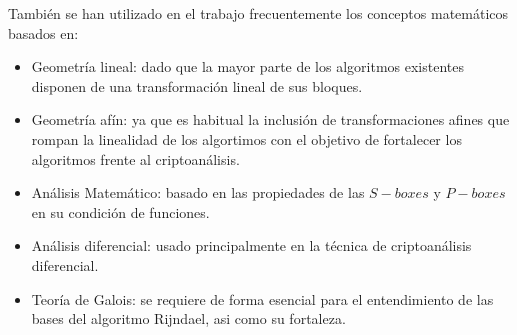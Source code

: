 También se han utilizado en el trabajo frecuentemente los conceptos matemáticos basados en:
\begin{itemize}
	\item Geometría lineal: dado que la mayor parte de los algoritmos existentes disponen de una transformación lineal de sus bloques.
	\item Geometría afín: ya que es habitual la inclusión de transformaciones afines que rompan la linealidad de los algortimos con el objetivo de fortalecer los algoritmos frente al criptoanálisis.
	\item Análisis Matemático: basado en las propiedades de las $S-boxes$ y $P-boxes$ en su condición de funciones.
	\item Análisis diferencial: usado principalmente en la técnica de criptoanálisis diferencial.
	\item Teoría de Galois: se requiere de forma esencial para el entendimiento de las bases del algoritmo Rijndael, asi como su fortaleza.
\end{itemize}

